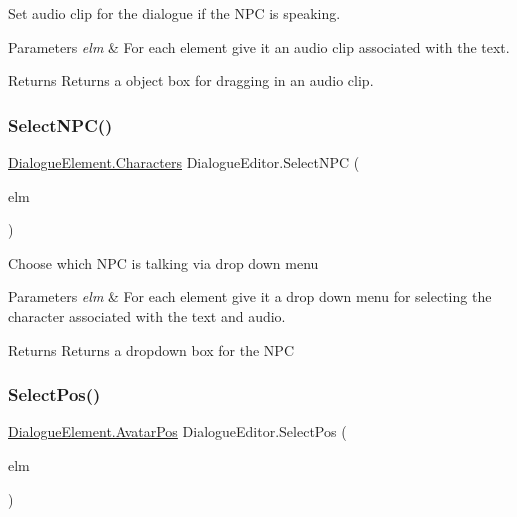 Set audio clip for the dialogue if the N\+PC is speaking. 


\begin{DoxyParams}{Parameters}
{\em elm} & For each element give it an audio clip associated with the text.\\
\hline
\end{DoxyParams}
\begin{DoxyReturn}{Returns}
Returns a object box for dragging in an audio clip.
\end{DoxyReturn}
\mbox{\label{class_dialogue_editor_a9bc812d2ac0daea075c7c6d408a524dd}} 
\subsubsection{\texorpdfstring{Select\+N\+P\+C()}{SelectNPC()}}
{\footnotesize\ttfamily \mbox{\hyperlink{class_dialogue_element_ae49b75aacbe9e237b4801a4153dd1bfa}{Dialogue\+Element.\+Characters}} Dialogue\+Editor.\+Select\+N\+PC (\begin{DoxyParamCaption}\item[{\mbox{\hyperlink{class_dialogue_element}{Dialogue\+Element}}}]{elm }\end{DoxyParamCaption})\hspace{0.3cm}{\ttfamily [private]}}



Choose which N\+PC is talking via drop down menu 


\begin{DoxyParams}{Parameters}
{\em elm} & For each element give it a drop down menu for selecting the character associated with the text and audio. \\
\hline
\end{DoxyParams}
\begin{DoxyReturn}{Returns}
Returns a dropdown box for the N\+PC
\end{DoxyReturn}
\mbox{\label{class_dialogue_editor_a91ae346ba8ec20e732d1dfc3eb12aad4}} 
\subsubsection{\texorpdfstring{Select\+Pos()}{SelectPos()}}
{\footnotesize\ttfamily \mbox{\hyperlink{class_dialogue_element_a4713e15d24a53d5487f1d51b89cd55ee}{Dialogue\+Element.\+Avatar\+Pos}} Dialogue\+Editor.\+Select\+Pos (\begin{DoxyParamCaption}\item[{\mbox{\hyperlink{class_dialogue_element}{Dialogue\+Element}}}]{elm }\end{DoxyParamCaption})\hspace{0.3cm}{\ttfamily [private]}}



